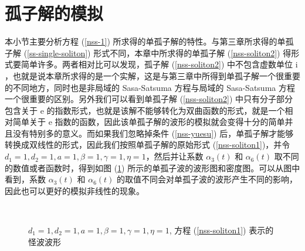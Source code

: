 \section{孤子解的模拟}
本小节主要分析方程 (\ref{nss-1}) 所求得的单孤子解的特性。与第三章所求得的单孤子解 (\ref{ss-single-soliton}) 形式不同，本章中所求得的单孤子解 (\ref{nss-soliton2}) 得形式要简单许多。两者相对比可以发现，孤子解 (\ref{nss-soliton2}) 中不包含虚数单位 $\mathrm{i}$，也就是说本章所求得的是一个实解，这是与第三章中所得到单孤子解一个很重要的不同地方，同时也是非局域的 Sasa-Satsuma 方程与局域的 Sasa-Satsuma 方程一个很重要的区别。另外我们可以看到单孤子解 (\ref{nss-soliton2}) 中只有分子部分包含关于 $\mathrm{e}$ 的指数形式，也就是该解不能够转化为双曲函数的形式，就是一个相对简单关于 $\mathrm{e}$ 指数的函数，因此该单孤子解的波形的模拟就会变得十分的简单并且没有特别多的意义。而如果我们忽略掉条件 (\ref{nss-yuesu}) 后，单孤子解才能够转换成双线性的形式，因此我们按照单孤子解的原始形式 (\ref{nss-soliton1})，并令 $d_1=1, d_2=1, a=1, \beta=1, \gamma=1,\eta=1$，然后并让系数 $\alpha_3(t)$ 和 $\alpha_6(t)$ 取不同的数值或者函数时，得到如图 (\ref{picture-nss-1}) 所示的单孤子波的波形图和密度图。可以从图中看到，系数 $\alpha_3(t)$ 和 $\alpha_6(t)$ 的取值不同会对单孤子波的波形产生不同的影响，因此也可以更好的模拟非线性的现象。


\begin{figure}[!htp]
	\centering
	\ \
	\ \
	
	\caption{$d_1=1, d_2=1, a=1, \beta=1, \gamma=1,\eta=1$, 方程 (\ref{nss-soliton1}) 表示的怪波波形}
	\label{picture-nss-1}
\end{figure}

